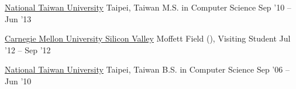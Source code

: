 \documentclass[10pt, a4paper]{article} %
\begin{document}

\headedsection %
{\href{http://www.ntu.edu.tw}{National Taiwan University}}
{Taipei, Taiwan}
{\headedsubsection %
	{M.S. in Computer Science}
	{Sep '10 -- Jun '13}
	{}
}

\headedsection %
{\href{http://www.cmu.edu/silicon-valley/}{Carnegie Mellon University Silicon Valley}}
{Moffett Field (), }
{\headedsubsection %
	{Visiting Student}
	{Jul '12 -- Sep '12} 
	{}
}

\headedsection %
{\href{http://www.ntu.edu.tw}{National Taiwan University}}
{Taipei, Taiwan}
{\headedsubsection %
	{B.S. in Computer Science}
	{Sep '06 -- Jun '10} 
	{\bodytext{}}
}

\spacedhrule{0.5em}{-1em} %


\end{document}
